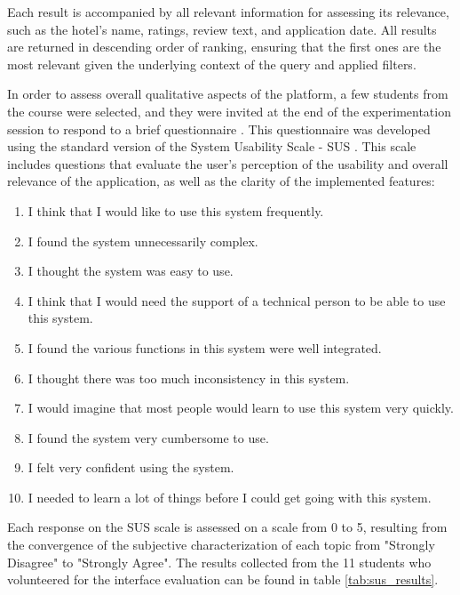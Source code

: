 \documentclass[sigconf]{acmart}
\begin{document}
Each result is accompanied by all relevant information for assessing its relevance, such as the hotel's name, ratings, review text, and application date. All results are returned in descending order of ranking, ensuring that the first ones are the most relevant given the underlying context of the query and applied filters.

In order to assess overall qualitative aspects of the platform, a few students from the course were selected, and they were invited at the end of the experimentation session to respond to a brief questionnaire \cite{Sus_form}. This questionnaire was developed using the standard version of the System Usability Scale - SUS \cite{SUS}. This scale includes questions that evaluate the user's perception of the usability and overall relevance of the application, as well as the clarity of the implemented features:

\begin{enumerate}

    \renewcommand{\labelenumi}{\arabic{enumi}.}
    \item I think that I would like to use this system frequently.
    \item I found the system unnecessarily complex.
    \item I thought the system was easy to use.
    \item I think that I would need the support of a technical person to be able to use this system.
    \item I found the various functions in this system were well integrated.
    \item I thought there was too much inconsistency in this system.
    \item I would imagine that most people would learn to use this system very quickly.
    \item I found the system very cumbersome to use.
    \item I felt very confident using the system.
    \item I needed to learn a lot of things before I could get going with this system.
\end{enumerate}


Each response on the SUS scale is assessed on a scale from 0 to 5, resulting from the convergence of the subjective characterization of each topic from "Strongly Disagree" to "Strongly Agree". The results collected from the 11 students who volunteered for the interface evaluation can be found in table \ref{tab:sus_results}.
\end{document}
